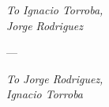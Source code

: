 \null\vfill
\centering

\emph{To Ignacio Torroba,}
\\
\emph{Jorge Rodriguez}

\vspace{2cm}
---
\vspace{2cm}

\emph{To Jorge Rodriguez,}
\\
\emph{Ignacio Torroba}

\null\vfill